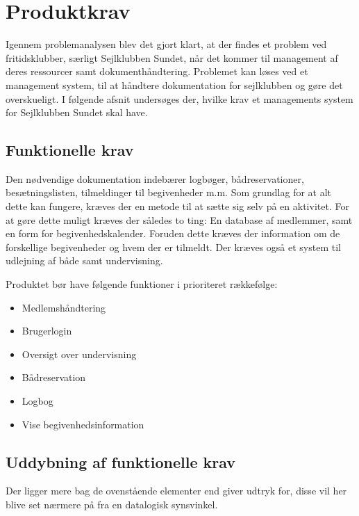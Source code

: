 \chapter{Produktkrav}

Igennem problemanalysen blev det gjort klart, at der findes et problem ved fritidsklubber, særligt Sejlklubben Sundet, når det kommer til management af deres ressourcer samt dokumenthåndtering. 
Problemet kan løses ved et management system, til at håndtere dokumentation for sejlklubben og gøre det overskueligt. 
I følgende afsnit undersøges der, hvilke krav et managements system for Sejlklubben Sundet skal have. 


\section{Funktionelle krav} \label{sec:funktionelleKrav}

Den nødvendige dokumentation indebærer logbøger, bådreservationer, besætningslisten, tilmeldinger til begivenheder m.m. 
Som grundlag for at alt dette kan fungere, kræves der en metode til at sætte sig selv på en aktivitet. 
For at gøre dette muligt kræves der således to ting: En database af medlemmer, samt en form for begivenhedskalender. 
Foruden dette kræves der information om de forskellige begivenheder og hvem der er tilmeldt. 
Der kræves også et system til udlejning af både samt undervisning.

Produktet bør have følgende funktioner i prioriteret rækkefølge:
\begin{itemize}
  \item Medlemshåndtering
  \item Brugerlogin
  \item Oversigt over undervisning
  \item Bådreservation
  \item Logbog
  \item Vise begivenhedsinformation
\end{itemize}



\section{Uddybning af funktionelle krav}

Der ligger mere bag de ovenstående elementer end  giver udtryk for, disse vil her blive set nærmere på fra en datalogisk synsvinkel.

